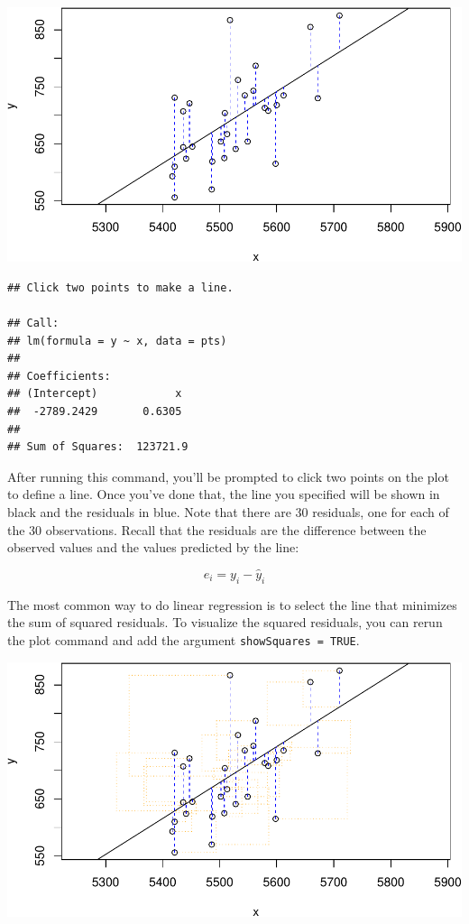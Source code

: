 \documentclass[]{article}
\newenvironment{Shaded}{\begin{snugshade}}{\end{snugshade}}
\newcommand{\KeywordTok}[1]{\textcolor[rgb]{0.13,0.29,0.53}{\textbf{#1}}}
\newcommand{\DataTypeTok}[1]{\textcolor[rgb]{0.13,0.29,0.53}{#1}}
\newcommand{\OtherTok}[1]{\textcolor[rgb]{0.56,0.35,0.01}{#1}}
\newcommand{\OperatorTok}[1]{\textcolor[rgb]{0.81,0.36,0.00}{\textbf{#1}}}
\newcommand{\NormalTok}[1]{#1}
\begin{document}
\includegraphics{DATA_606_Lab_7_files/figure-latex/plotss-atbats-runs-1.pdf}

\begin{verbatim}
## Click two points to make a line.
                                
## Call:
## lm(formula = y ~ x, data = pts)
## 
## Coefficients:
## (Intercept)            x  
##  -2789.2429       0.6305  
## 
## Sum of Squares:  123721.9
\end{verbatim}

After running this command, you'll be prompted to click two points on
the plot to define a line. Once you've done that, the line you specified
will be shown in black and the residuals in blue. Note that there are 30
residuals, one for each of the 30 observations. Recall that the
residuals are the difference between the observed values and the values
predicted by the line:

\[
  e_i = y_i - \hat{y}_i
\]

The most common way to do linear regression is to select the line that
minimizes the sum of squared residuals. To visualize the squared
residuals, you can rerun the plot command and add the argument
\texttt{showSquares\ =\ TRUE}.

\begin{Shaded}
\end{Shaded}

\includegraphics{DATA_606_Lab_7_files/figure-latex/plotss-atbats-runs-squares-1.pdf}
\end{document}
